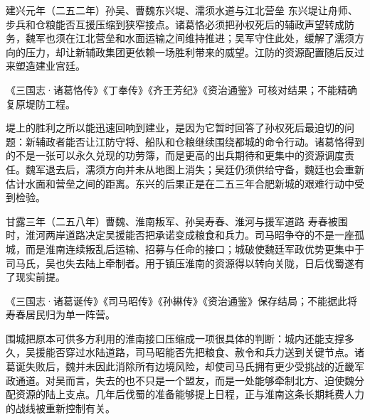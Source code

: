 \begin{event}{}{建兴元年（二五二年）}{孙吴、曹魏}{东兴堤、濡须水道与江北营垒}
东兴堤让舟师、步兵和仓粮能否互援压缩到狭窄接点。诸葛恪必须把孙权死后的辅政声望转成防务，魏军也须在江北营垒和水面运输之间维持推进；吴军守住此处，缓解了濡须方向的压力，却让新辅政集团更依赖一场胜利带来的威望。江防的资源配置随后反过来塑造建业宫廷。

\begin{sourcenote}
《三国志·诸葛恪传》《丁奉传》《齐王芳纪》《资治通鉴》可核对结果；不能精确复原堤防工程。
\end{sourcenote}

堤上的胜利之所以能迅速回响到建业，是因为它暂时回答了孙权死后最迫切的问题：新辅政者能否让江防守将、船队和仓粮继续围绕都城的命令行动。诸葛恪得到的不是一张可以永久兑现的功劳簿，而是更高的出兵期待和更集中的资源调度责任。魏军退去后，濡须方向并未从地图上消失；吴廷仍须供给守备，魏廷也会重新估计水面和营垒之间的距离。东兴的后果正是在二五三年合肥新城的艰难行动中受到检验。
\end{event}

\begin{event}{}{甘露三年（二五八年）}{曹魏、淮南叛军、孙吴}{寿春、淮河与援军道路}
寿春被围时，淮河两岸道路决定吴援能否把承诺变成粮食和兵力。司马昭争夺的不是一座孤城，而是淮南连续叛乱后运输、招募与任命的接口；城破使魏廷军政优势更集中于司马氏，吴也失去陆上牵制者。用于镇压淮南的资源得以转向关陇，日后伐蜀遂有了现实前提。

\begin{sourcenote}[寿春陷落不等于城内只有一种选择]
《三国志·诸葛诞传》《司马昭传》《孙綝传》《资治通鉴》保存结局；不能据此将寿春居民归为单一阵营。
\end{sourcenote}

围城把原本可供多方利用的淮南接口压缩成一项很具体的判断：城内还能支撑多久，吴援能否穿过水陆道路，司马昭能否先把粮食、赦令和兵力送到关键节点。诸葛诞失败后，魏并未因此消除所有边境风险，却使司马氏拥有更少受挑战的近畿军政通道。对吴而言，失去的也不只是一个盟友，而是一处能够牵制北方、迫使魏分配资源的陆上支点。几年后伐蜀的准备能够提上日程，正与淮南这条长期耗费人力的战线被重新控制有关。
\end{event}
